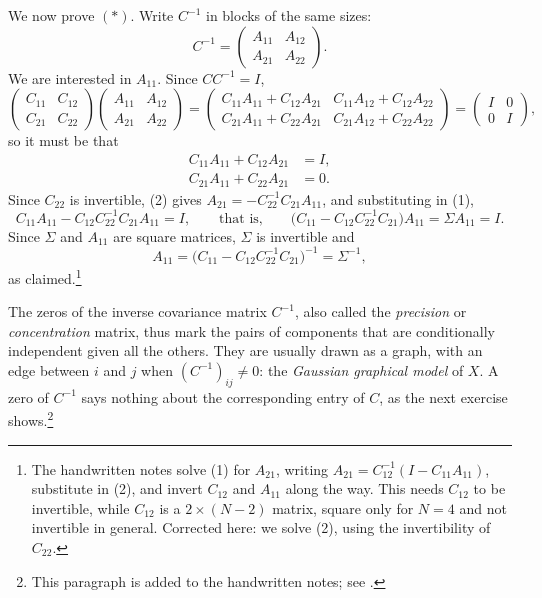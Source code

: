\begin{example}
We now prove $(*)$. Write $C^{-1}$ in blocks of the same sizes:
\[
  C^{-1}=\begin{pmatrix}A_{11}&A_{12}\\A_{21}&A_{22}\end{pmatrix}.
\]
We are interested in $A_{11}$. Since $CC^{-1}=I$,
\[
  \begin{pmatrix}C_{11}&C_{12}\\C_{21}&C_{22}\end{pmatrix}\begin{pmatrix}A_{11}&A_{12}\\A_{21}&A_{22}\end{pmatrix}
  =\begin{pmatrix}C_{11}A_{11}+C_{12}A_{21}&C_{11}A_{12}+C_{12}A_{22}\\C_{21}A_{11}+C_{22}A_{21}&C_{21}A_{12}+C_{22}A_{22}\end{pmatrix}
  =\begin{pmatrix}I&0\\0&I\end{pmatrix},
\]
so it must be that
\begin{align}
  C_{11}A_{11}+C_{12}A_{21}&=I,\tag{1}\\
  C_{21}A_{11}+C_{22}A_{21}&=0.\tag{2}
\end{align}
Since $C_{22}$ is invertible, (2) gives $A_{21}=-C_{22}^{-1}C_{21}A_{11}$, and substituting in (1),
\[
  C_{11}A_{11}-C_{12}C_{22}^{-1}C_{21}A_{11}=I,\qquad\text{that is,}\qquad
  \big(C_{11}-C_{12}C_{22}^{-1}C_{21}\big)A_{11}=\Sigma A_{11}=I .
\]
Since $\Sigma$ and $A_{11}$ are square matrices, $\Sigma$ is invertible and
\[
  A_{11}=\big(C_{11}-C_{12}C_{22}^{-1}C_{21}\big)^{-1}=\Sigma^{-1},
\]
as claimed.\footnote{The handwritten notes solve (1) for $A_{21}$, writing
$A_{21}=C_{12}^{-1}(I-C_{11}A_{11})$, substitute in (2), and invert $C_{12}$ and $A_{11}$ along the
way. This needs $C_{12}$ to be invertible, while $C_{12}$ is a $2\times(N-2)$ matrix, square only for
$N=4$ and not invertible in general. Corrected here: we solve (2), using the invertibility of
$C_{22}$.}
\end{example}

The zeros of the inverse covariance matrix $C^{-1}$, also called the \emph{precision} or
\emph{concentration} matrix, thus mark the pairs of components that are conditionally independent
given all the others. They are usually drawn as a graph, with an edge between $i$ and $j$ when
$(C^{-1})_{ij}\ne0$: the \emph{Gaussian graphical model} of $X$. A zero of $C^{-1}$ says nothing
about the corresponding entry of $C$, as the next exercise shows.\footnote{This paragraph is added to
the handwritten notes; see \citet[Chapter~5]{lauritzen-graphical}.}

